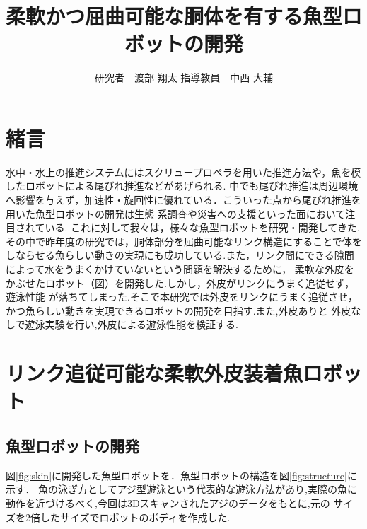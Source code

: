 \documentclass{jarticle}
\begin{document}

\title{
柔軟かつ屈曲可能な胴体を有する魚型ロボットの開発
}
\author{
研究者　渡部 翔太\;\;\;
指導教員　中西 大輔
}

\maketitle

\thispagestyle{empty}  %

\section{緒言}
水中・水上の推進システムにはスクリュープロペラを用いた推進方法や，魚を模したロボットによる尾びれ推進などがあげられる\cite{ichi}.
中でも尾びれ推進は周辺環境へ影響を与えず，加速性・旋回性に優れている．こういった点から尾びれ推進を用いた魚型ロボットの開発は生態
系調査や災害への支援といった面において注目されている\cite{ni}.
これに対して我々は，様々な魚型ロボットを研究・開発してきた.その中で昨年度の研究では，胴体部分を屈曲可能なリンク構造にすることで体を
しならせる魚らしい動きの実現にも成功している.また，リンク間にできる隙間によって水をうまくかけていないという問題を解決するために，
柔軟な外皮をかぶせたロボット（図）を開発した\cite{san}.しかし，外皮がリンクにうまく追従せず，遊泳性能
が落ちてしまった.そこで本研究では外皮をリンクにうまく追従させ，かつ魚らしい動きを実現できるロボットの開発を目指す.また,外皮ありと
外皮なしで遊泳実験を行い,外皮による遊泳性能を検証する.

\section{リンク追従可能な柔軟外皮装着魚ロボット}
\subsection{魚型ロボットの開発}
図\ref{fig:skin}に開発した魚型ロボットを．魚型ロボットの構造を図\ref{fig:structure}に示す．
魚の泳ぎ方としてアジ型遊泳という代表的な遊泳方法があり,実際の魚に動作を近づけるべく,今回は3Dスキャンされたアジのデータをもとに,元の
サイズを2倍したサイズでロボットのボディを作成した.
\end{document}
